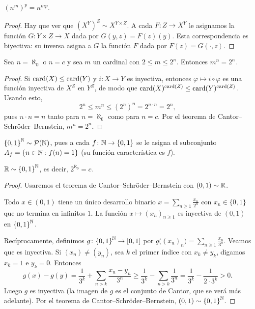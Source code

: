 \begin{prop}
  \({(n^m)}^p = n^{m p}\).
\end{prop}

\begin{proof}
  Hay que ver que \({(X^Y)}^Z \sim X^{Y \times Z}\). A cada \(F\colon Z \to X^Y\) le asignamos la función \(G\colon Y \times Z \to X\) dada por \(G(y, z) = F(z)(y)\). Esta correspondencia es biyectiva: su inversa asigna a \(G\) la función \(F\) dada por \(F(z) = G(\cdot, z)\).
\end{proof}

\begin{theorem}
  Sea \(n = \aleph_0\) o \(n = c\) y sea \(m\) un cardinal con \(2 \leq m \leq 2^n\). Entonces \(m^n = 2^n\).
\end{theorem}

\begin{proof}
  Si \(\operatorname{card}(X) \leq \operatorname{card}(Y)\) y \(i\colon X \to Y\) es inyectiva, entonces \(\varphi \mapsto i \circ \varphi\) es una función inyectiva de \(X^Z\) en \(Y^Z\), de modo que \(\operatorname{card}(X)^{\operatorname{card}(Z)} \leq \operatorname{card}(Y)^{\operatorname{card}(Z)}\). Usando esto,
  \[
    2^n \leq m^n \leq {(2^n)}^n = 2^{n \cdot n} = 2^n,
  \]
  pues \(n \cdot n = n\) tanto para \(n = \aleph_0\) como para \(n = c\). Por el teorema de Cantor--Schröder--Bernstein, \(m^n = 2^n\).
\end{proof}

\begin{note}
  \({\{0, 1\}}^{\mathbb{N}} \sim \mathcal{P}(\mathbb{N})\), pues a cada \(f\colon \mathbb{N} \to \{0, 1\}\) se le asigna el subconjunto \(A_f = \{ n \in \mathbb{N} : f(n) = 1 \}\) (su función característica es \(f\)).
\end{note}

\begin{theorem}
  \(\mathbb{R} \sim {\{0, 1\}}^{\mathbb{N}}\), es decir, \(2^{\aleph_0} = c\).
\end{theorem}

\begin{proof}
  Usaremos el teorema de Cantor--Schröder--Bernstein con \((0, 1) \sim \mathbb{R}\).

  Todo \(x \in (0, 1)\) tiene un único desarrollo binario \(x = \sum_{n \geq 1} \frac{x_n}{2^n}\) con \(x_n \in \{0, 1\}\) que no termina en infinitos \(1\). La función \(x \mapsto {(x_n)}_{n \geq 1}\) es inyectiva de \((0, 1)\) en \({\{0, 1\}}^{\mathbb{N}}\).

  Recíprocamente, definimos \(g\colon {\{0, 1\}}^{\mathbb{N}} \to [0, 1]\) por \(g\bigl({(x_n)}_{n}\bigr) = \sum_{n \geq 1} \frac{x_n}{3^n}\). Veamos que es inyectiva. Si \({(x_n)} \neq {(y_n)}\), sea \(k\) el primer índice con \(x_k \neq y_k\), digamos \(x_k = 1\) e \(y_k = 0\). Entonces
  \[
    g(x) - g(y) = \frac{1}{3^k} + \sum_{n > k} \frac{x_n - y_n}{3^n} \geq \frac{1}{3^k} - \sum_{n > k} \frac{1}{3^n} = \frac{1}{3^k} - \frac{1}{2 \cdot 3^k} > 0.
  \]
  Luego \(g\) es inyectiva (la imagen de \(g\) es el conjunto de Cantor, que se verá más adelante). Por el teorema de Cantor--Schröder--Bernstein, \((0, 1) \sim {\{0, 1\}}^{\mathbb{N}}\).
\end{proof}

